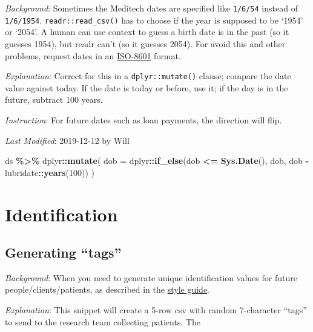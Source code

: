 \documentclass[
]{book}
\newenvironment{Shaded}{\begin{snugshade}}{\end{snugshade}}
\newcommand{\DataTypeTok}[1]{\textcolor[rgb]{0.13,0.29,0.53}{#1}}
\newcommand{\DecValTok}[1]{\textcolor[rgb]{0.00,0.00,0.81}{#1}}
\newcommand{\KeywordTok}[1]{\textcolor[rgb]{0.13,0.29,0.53}{\textbf{#1}}}
\newcommand{\NormalTok}[1]{#1}
\newcommand{\OperatorTok}[1]{\textcolor[rgb]{0.81,0.36,0.00}{\textbf{#1}}}
\newcommand{\StringTok}[1]{\textcolor[rgb]{0.31,0.60,0.02}{#1}}
\begin{document}
\emph{Background}: Sometimes the Meditech dates are specified like \texttt{1/6/54} instead of \texttt{1/6/1954}. \texttt{readr::read\_csv()} has to choose if the year is supposed to be `1954' or `2054'. A human can use context to guess a birth date is in the past (so it guesses 1954), but readr can't (so it guesses 2054). For avoid this and other problems, request dates in an \href{https://www.explainxkcd.com/wiki/index.php/1179:_ISO_8601}{ISO-8601} format.

\emph{Explanation}: Correct for this in a \texttt{dplyr::mutate()} clause; compare the date value against today. If the date is today or before, use it; if the day is in the future, subtract 100 years.

\emph{Instruction}: For future dates such as loan payments, the direction will flip.

\emph{Last Modified}: 2019-12-12 by Will

\begin{Shaded}
\begin{Highlighting}[]
\NormalTok{ ds }\OperatorTok{\%>\%}
\StringTok{ }\NormalTok{dplyr}\OperatorTok{::}\KeywordTok{mutate}\NormalTok{(}
    \DataTypeTok{dob   =}\NormalTok{ dplyr}\OperatorTok{::}\KeywordTok{if\_else}\NormalTok{(dob }\OperatorTok{<=}\StringTok{ }\KeywordTok{Sys.Date}\NormalTok{(), dob, dob }\OperatorTok{{-}}\StringTok{ }\NormalTok{lubridate}\OperatorTok{::}\KeywordTok{years}\NormalTok{(}\DecValTok{100}\NormalTok{))}
\NormalTok{  )}
\end{Highlighting}
\end{Shaded}

\hypertarget{identification}{%
\section{Identification}\label{identification}}

\hypertarget{snippet-tag}{%
\subsection{Generating ``tags''}\label{snippet-tag}}

\emph{Background}: When you need to generate unique identification values for future people/clients/patients, as described in the \protect\hyperlink{style-number}{style guide}.

\emph{Explanation}: This snippet will create a 5-row csv with random 7-character ``tags'' to send to the research team collecting patients. The
\end{document}
